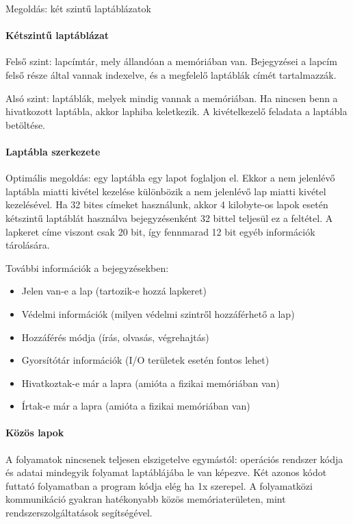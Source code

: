 \documentclass[fleqn,10pt,a4paper]{article}
\theoremstyle{magyar}
\begin{document}
  Megoldás: két szintű laptáblázatok 

  \paragraph{Kétszintű laptáblázat}  Felső szint: lapcímtár, mely állandóan a memóriában van. Bejegyzései a lapcím felső
  része által vannak indexelve, és a megfelelő laptáblák címét tartalmazzák.
  
  Alsó szint: laptáblák, melyek mindig vannak a memóriában. Ha nincsen benn a hivatkozott laptábla, akkor laphiba
  keletkezik. A kivételkezelő feladata a laptábla betöltése.

  \paragraph{Laptábla szerkezete} Optimális megoldás: egy laptábla egy lapot foglaljon el. Ekkor a nem jelenlévő
  laptábla miatti kivétel kezelése különbözik a nem jelenlévő lap miatti kivétel kezelésével. Ha 32 bites címeket
  használunk, akkor 4 kilobyte-os lapok esetén kétszintű laptáblát használva bejegyzésenként 32 bittel teljesül ez a
  feltétel. A lapkeret címe viszont csak 20 bit, így fennmarad 12 bit egyéb információk tárolására.

  További információk a bejegyzésekben:
  \begin{itemize}
  \item Jelen van-e a lap (tartozik-e hozzá lapkeret) 
  \item Védelmi információk (milyen védelmi szintről hozzáférhető a lap) 
  \item Hozzáférés módja (írás, olvasás, végrehajtás) 
  \item Gyorsítótár információk (I/O területek esetén fontos lehet) 
  \item Hivatkoztak-e már a lapra (amióta a fizikai memóriában van) 
  \item Írtak-e már a lapra (amióta a fizikai memóriában van)
  \end{itemize}

  \paragraph{Közös lapok} A folyamatok nincsenek teljesen elszigetelve egymástól: operációs rendszer kódja és adatai
  mindegyik folyamat laptáblájába le van képezve. Két azonos kódot futtató folyamatban a program kódja elég ha 1x
  szerepel. A folyamatközi kommunikáció gyakran hatékonyabb közös memóriaterületen, mint rendszerszolgáltatások
  segítségével.
  
\end{document}
